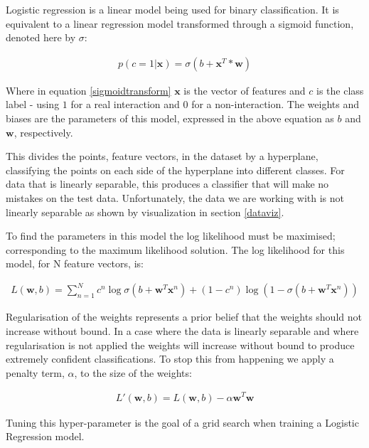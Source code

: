 Logistic regression is a linear model being used for binary classification.
It is equivalent to a linear regression model transformed through a sigmoid function\autocite[376]{murphy_machine_2012}, denoted here by $\sigma$:

\begin{align}
    p(c=1|\pmb{x}) = \sigma(b + \pmb{x}^{T}*\pmb{w})
    \label{sigmoidtransform}
\end{align}

Where in equation \ref{sigmoidtransform} $\pmb{x}$ is the vector of features and $c$ is the class label - using $1$ for a real interaction and $0$ for a non-interaction.
The weights and biases are the parameters of this model, expressed in the above equation as $b$ and $\pmb{w}$, respectively.

This divides the points, feature vectors, in the dataset by a hyperplane, classifying the points on each side of the hyperplane into different classes.
For data that is linearly separable, this produces a classifier that will make no mistakes on the test data.
Unfortunately, the data we are working with is not linearly separable as shown by visualization in section \ref{dataviz}.

To find the parameters in this model the log likelihood must be maximised; corresponding to the maximum likelihood solution.
The log likelihood for this model, for N feature vectors, is:

\begin{align}
    L(\pmb{w},b) = \sum_{n=1}^{N} c^{n} \log \sigma(b + \pmb{w}^{T}\pmb{x}^{n}) + (1 - c^{n})\log (1 - \sigma(b + \pmb{w}^{T}\pmb{x}^{n}))
\end{align}

Regularisation of the weights represents a prior belief that the weights should not increase without bound.
In a case where the data is linearly separable and where regularisation is not applied the weights will increase without bound to produce extremely confident classifications\autocite[381]{barber_bayesian_2013}.
To stop this from happening we apply a penalty term, $\alpha$, to the size of the weights:

\begin{align}
    L'(\pmb{w},b) = L(\pmb{w},b) - \alpha \pmb{w}^{T}\pmb{w}
\end{align}

Tuning this hyper-parameter is the goal of a grid search when training a Logistic Regression model.
